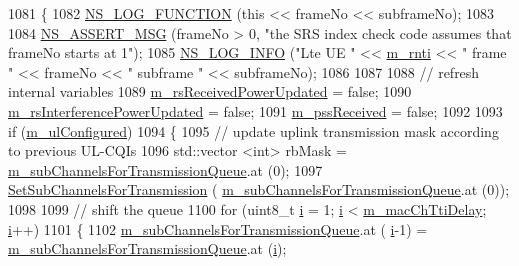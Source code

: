 \begin{DoxyCode}
1081 \{
1082   \hyperlink{log-macros-disabled_8h_a90b90d5bad1f39cb1b64923ea94c0761}{NS\_LOG\_FUNCTION} (\textcolor{keyword}{this} << frameNo << subframeNo);
1083 
1084   \hyperlink{assert_8h_aff5ece9066c74e681e74999856f08539}{NS\_ASSERT\_MSG} (frameNo > 0, \textcolor{stringliteral}{"the SRS index check code assumes that frameNo starts at 1"});
1085   \hyperlink{group__logging_gafbd73ee2cf9f26b319f49086d8e860fb}{NS\_LOG\_INFO} (\textcolor{stringliteral}{"Lte UE "} << \hyperlink{classns3_1_1LteUePhy_a887b5dc4e246a308cd09127b64ed8fac}{m\_rnti} << \textcolor{stringliteral}{" frame "} << frameNo << \textcolor{stringliteral}{" subframe "} << subframeNo);
1086 
1087 
1088   \textcolor{comment}{// refresh internal variables}
1089   \hyperlink{classns3_1_1LteUePhy_abd50d8b4eab7a7dd0cb44267d4cb982d}{m\_rsReceivedPowerUpdated} = \textcolor{keyword}{false};
1090   \hyperlink{classns3_1_1LteUePhy_a4ab51d98c08937a722e722ec81ba0f58}{m\_rsInterferencePowerUpdated} = \textcolor{keyword}{false};
1091   \hyperlink{classns3_1_1LteUePhy_a5ab022b1bccbff633af1f2189b68305a}{m\_pssReceived} = \textcolor{keyword}{false};
1092 
1093   \textcolor{keywordflow}{if} (\hyperlink{classns3_1_1LteUePhy_ac90075a25fb13b52d70c1937cf83dd56}{m\_ulConfigured})
1094     \{
1095       \textcolor{comment}{// update uplink transmission mask according to previous UL-CQIs}
1096       std::vector <int> rbMask = \hyperlink{classns3_1_1LteUePhy_a552aae33d3ca8d710bcb83b7aaeb2844}{m\_subChannelsForTransmissionQueue}.at (0);
1097       \hyperlink{classns3_1_1LteUePhy_a0b004ef45d225a8cf75647db08aeab9b}{SetSubChannelsForTransmission} (
      \hyperlink{classns3_1_1LteUePhy_a552aae33d3ca8d710bcb83b7aaeb2844}{m\_subChannelsForTransmissionQueue}.at (0));
1098 
1099       \textcolor{comment}{// shift the queue}
1100       \textcolor{keywordflow}{for} (uint8\_t \hyperlink{bernuolliDistribution_8m_a6f6ccfcf58b31cb6412107d9d5281426}{i} = 1; \hyperlink{bernuolliDistribution_8m_a6f6ccfcf58b31cb6412107d9d5281426}{i} < \hyperlink{classns3_1_1LtePhy_affeee2ab376466f7e8097ef3e3c3279e}{m\_macChTtiDelay}; \hyperlink{bernuolliDistribution_8m_a6f6ccfcf58b31cb6412107d9d5281426}{i}++)
1101         \{
1102           \hyperlink{classns3_1_1LteUePhy_a552aae33d3ca8d710bcb83b7aaeb2844}{m\_subChannelsForTransmissionQueue}.at (
      \hyperlink{bernuolliDistribution_8m_a6f6ccfcf58b31cb6412107d9d5281426}{i}-1) = \hyperlink{classns3_1_1LteUePhy_a552aae33d3ca8d710bcb83b7aaeb2844}{m\_subChannelsForTransmissionQueue}.at (\hyperlink{bernuolliDistribution_8m_a6f6ccfcf58b31cb6412107d9d5281426}{i});

\end{DoxyCode}
